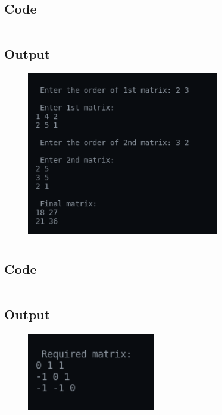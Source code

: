\documentclass[12pt]{article}
\begin{document}
\section{}
\subsection{Code}
\inputminted{c}{q6.c}
\newpage
\subsection{Output}
\begin{figure}[h]
    \centering
    \includegraphics[width=0.75\textwidth]{6.png}
\end{figure}

\newpage
\section{}
\subsection{Code}
\inputminted{c}{q7.c}
\subsection{Output}
\begin{figure}[h]
    \centering
    \includegraphics[width=0.5\textwidth]{7.png}
\end{figure}
\end{document}
